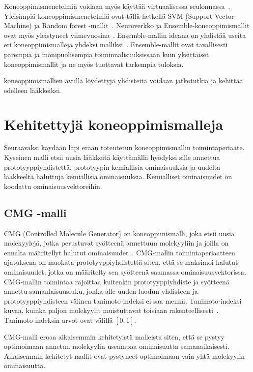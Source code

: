 \documentclass[finnish,twoside,censored,tkt,sw-line]{HYthesisML}
\begin{document}
Koneoppimismenetelmiä voidaan myös käyttää virtuaalisessa seulonnassa~\cite{SotrifferChristoph2011VSPC}.
Yleisimpiä koneoppimismenetelmiä ovat tällä hetkellä SVM (Support Vector Machine) ja Random forest -mallit~\cite{SotrifferChristoph2011VSPC}.
Neuroverkko ja Ensemble-koneoppimismallit ovat myös yleistyneet viimevuosina~\cite{ShinBonggun,PopovaMariya2018Drlf}.
Ensemble-mallin ideana on yhdistää useita eri koneoppimismalleja yhdeksi malliksi~\cite{RokachLior2009Ec}.
Ensemble-mallit ovat tavallisesti parempia ja monipuolisempia toiminnalisuuksissaan kuin yksittäiset koneoppimismallit ja ne myös tuottavat tarkempia tuloksia.

koneoppimismallien avulla löydettyjä yhdisteitä voidaan jatkotutkia ja kehittää edelleen lääkkeiksi.

\section{Kehitettyjä koneoppimismalleja}

Seuraavaksi käydään läpi erään toteutetun koneoppimismallin toimintaperiaate.
Kyseinen malli etsii uusia lääkkeitä käyttämällä hyödyksi sille annettua prototyyppiyhdistettä, prototyypin kemiallisia ominaisuuksia ja uudelta lääkkeeltä haluttuja kemiallisia ominaisuuksia.
Kemialliset ominaisuudet on koodattu ominaisuusvektoreihin.

\subsection{CMG -malli}

CMG (Controlled Molecule Generator) on koneoppimismalli, joka etsii uusia molekyylejä, jotka perustuvat syötteenä annettuun molekyyliin ja joilla on ennalta määritellyt halutut ominaisuudet~\cite{ShinBonggun}.
CMG-mallin toimintaperiaatteen ajatuksena on muokata prototyyppiyhdistettä siten, että se maksimoi halutut ominaisuudet, jotka on määritelty sen syötteenä saamassa ominaisuusvektorissa.
CMG-mallin toimintaa rajoittaa kuitenkin prototyyppiyhdiste ja syötteenä annettu samanlaisuusluku, jonka alle uuden luodun yhdisteen ja prototyyppiyhdisteen välinen tanimoto-indeksi ei saa mennä.
Tanimoto-indeksi kuvaa, kuinka paljon molekyylit muistuttavat toisiaan rakenteellisesti~\cite{MaggioraGerald2014Msim}.
Tanimoto-indeksin arvot ovat välillä \([0,1]\).

CMG-malli eroaa aikaisemmin kehitetyistä malleista siten, että se pystyy optimoimaan annetun molekyylin useampaa ominaisuutta samanaikaisesti.
Aikaisemmin kehitetyt mallit ovat pystyneet optimoimaan vain yhtä molekyylin ominaisuutta.
\end{document}
